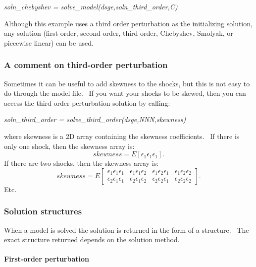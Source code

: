 \documentclass[notitlepage,11pt]{article}
\begin{document}
\textit{soln\_chebyshev = solve\_model(dsge,soln\_third\_order,C)}

\bigskip

Although this example uses a third order perturbation as the initializing
solution, any solution (first order, second order, third order, Chebyshev,
Smolyak, or piecewise linear) can be used.

\subsubsection{A comment on third-order perturbation}

Sometimes it can be useful to add skewness to the shocks, but this is not
easy to do through the model file. \ If you want your shocks to be skewed,
then you can access the third order perturbation solution by calling:

\bigskip

\textit{soln\_third\_order = solve\_third\_order(dsge,NNN,skewness)}

\bigskip

where skewness is a 2D array containing the skewness coefficients. \ If
there is only one shock, then the skewness array is:%
\begin{equation*}
skewness=E\left[ \epsilon _{1}\epsilon _{1}\epsilon _{1}\right] .
\end{equation*}%
If there are two shocks, then the skewness array is:%
\begin{equation*}
skewness=E\left[ 
\begin{array}{cccc}
\epsilon _{1}\epsilon _{1}\epsilon _{1} & \epsilon _{1}\epsilon _{1}\epsilon
_{2} & \epsilon _{1}\epsilon _{2}\epsilon _{1} & \epsilon _{1}\epsilon
_{2}\epsilon _{2} \\ 
\epsilon _{2}\epsilon _{1}\epsilon _{1} & \epsilon _{2}\epsilon _{1}\epsilon
_{2} & \epsilon _{2}\epsilon _{2}\epsilon _{1} & \epsilon _{2}\epsilon
_{2}\epsilon _{2}%
\end{array}%
\right] .
\end{equation*}%
Etc.

\subsubsection{Solution structures}

When a model is solved the solution is returned in the form of a structure.
\ The exact structure returned depends on the solution method.

\paragraph{First-order perturbation}
\end{document}
